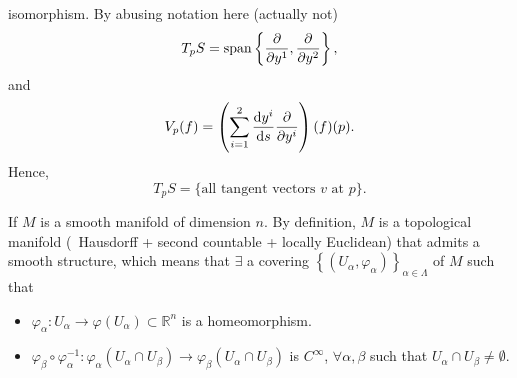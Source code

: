 \begin{enumerate}[(1)]
\begin{itemize}
        isomorphism. By abusing notation here (actually not)
        \[
            T_p S=\Span \left\{\pdv{y^1},\pdv{y^2}\right\}    
        ,\]
        and 
        \[
            V_p (f)=\left(\sum_{i=1}^2\dv{y^i}{s}\pdv{y^i}\right)(f)(p)    
        .\]
        Hence,
        \[
            T_p S=\{\text{all tangent vectors }v\text{ at }p\}.    
        \]
    \end{itemize}
    \begin{remark}
        If \(M\) is a smooth manifold of dimension \(n\). By definition,
        \(M\) is a topological manifold (\ie\ Hausdorff + second countable 
        + locally Euclidean) that admits a smooth structure, which means 
        that \(\exists\) a covering \(\left\{(U_\alpha,\varphi_\alpha)
        \right\}_{\alpha\in \Lambda}\) of \(M\) such that
        \begin{itemize}
            \item \(\varphi_\alpha\colon U_\alpha\to \varphi
            \left(U_\alpha\right)\subset \mathbb{R}^n\) is a 
            homeomorphism.
            \item \(\varphi_\beta\circ \varphi_\alpha^{-1}\colon
            \varphi_\alpha\left(U_\alpha\cap U_\beta\right)
            \to \varphi_\beta\left(U_\alpha\cap U_\beta\right)
            \)
            is \(C^\infty\), \(\forall\alpha,\beta\) such that 
            \(U_\alpha\cap U_\beta\neq \emptyset\).
        \end{itemize}
        \begin{center}
            



\begin{tikzpicture}[x=0.75pt,y=0.75pt,yscale=-1,xscale=1]


\end{tikzpicture}
\end{center}
\end{remark}
\end{enumerate}
